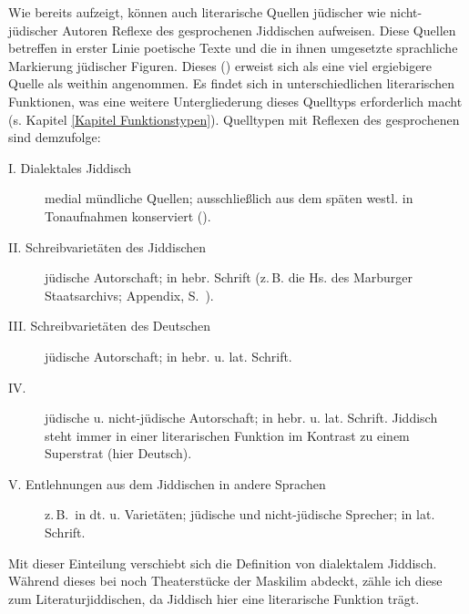 Wie bereits \cite{Weinreich1953} aufzeigt, können auch literarische Quellen jüdischer wie nicht-jüdischer Autoren Reflexe des gesprochenen Jiddischen aufweisen. Diese Quellen betreffen in erster Linie poetische Texte und die in ihnen umgesetzte sprachliche Markierung jüdischer Figuren. Dieses \hai{{\LiJi}} (\citealt{Richter1995}) erweist sich als eine viel ergiebigere Quelle als weithin angenommen. Es findet sich in unterschiedlichen literarischen Funktionen, was eine weitere Untergliederung dieses Quelltyps erforderlich macht (s. Kapitel \ref{Kapitel Funktionstypen}). Quelltypen mit Reflexen des gesprochenen  sind demzufolge: 

\begin{description}
\item [I. Dialektales Jiddisch]  medial mündliche Quellen; ausschließlich aus dem späten westl. \hai{{\SWJ}} in Tonaufnahmen konserviert (\citealt{GuggenheimGruenberg1966,Fleischer2005}).
\item [II. Schreibvarietäten des Jiddischen] jüdische Autorschaft; in hebr. Schrift (z.\,B. die Hs. des Marburger Staatsarchivs; Appendix, S.\, \pageref{part_schirm}).
\item [III. Schreibvarietäten des Deutschen] jüdische Autorschaft; in hebr. u. lat. Schrift.
\item [IV. ] jüdische u. nicht-jüdische Autorschaft; in hebr. u. lat. Schrift. Jiddisch steht immer in einer literarischen Funktion im Kontrast zu einem Superstrat (hier Deutsch).
\item [V. Entlehnungen aus dem Jiddischen in andere Sprachen] z.\,B.\, in dt. u. {\engl} Varietäten; jüdische und nicht-jüdische Sprecher; in lat. Schrift.
\end{description}

Mit dieser Einteilung verschiebt sich die Definition von dialektalem Jiddisch. Während dieses bei \cite{Lowenstein1979} noch Theaterstücke der Maskilim abdeckt, zähle ich diese zum Literaturjiddischen, da Jiddisch hier eine literarische Funktion trägt. 
  
  
  
